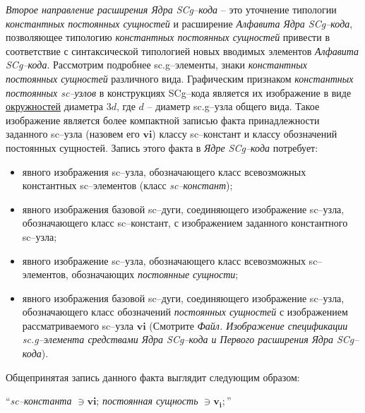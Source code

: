 \textit{Второе направление расширения Ядра SCg--кода} -- это уточнение типологии \textit{константных постоянных сущностей} и расширение \textit{Алфавита Ядра SCg--кода}, позволяющее типологию \textit{константных постоянных сущностей} привести в соответствие с синтаксической типологией новых вводимых элементов \textit{Алфавита SCg--кода}. Рассмотрим подробнее sc.g--элементы, знаки \textit{константных постоянных сущностей} различного вида. Графическим признаком \textit{константных постоянных sc--узлов} в конструкциях SCg--кода является их изображение в виде \uline{окружностей} диаметра $3d$, где $d$ -- диаметр sc.g--узла общего вида. Такое изображение является более компактной записью факта принадлежности заданного sc--узла (назовем его $\bm{vi}$) классу sc--констант и классу обозначений постоянных сущностей. Запись этого факта в \textit{Ядре SCg--кода} потребует:
\begin{itemize}
	\item явного изображения sc--узла, обозначающего класс всевозможных константных sc--элементов (класс \textit{sc--констант});  
	\item явного изображения базовой sc--дуги, соединяющего изображение sc--узла, обозначающего класс sc--констант, с изображением заданного константного sc--узла; 
	\item явного изображение sc--узла, обозначающего класс всевозможных sc--элементов, обозначающих \textit{постоянные сущности};
	\item явного изображения базовой sc--дуги, соединяющего изображение sc--узла, обозначающего класс обозначений \textit{постоянных сущностей} с изображением рассматриваемого sc--узла $\bm{vi}$ (Смотрите \textit{Файл. Изображение спецификации sc.g--элемента средствами Ядра SCg--кода и Первого расширения Ядра SCg--кода}).
\end{itemize}

\bigskip
Общепринятая запись данного факта выглядит следующим образом:

``\textit{sc--константа} $\ni \bm{vi}$; \textit{постоянная сущность} $\ni \bm{v_i};$''
\bigskip


